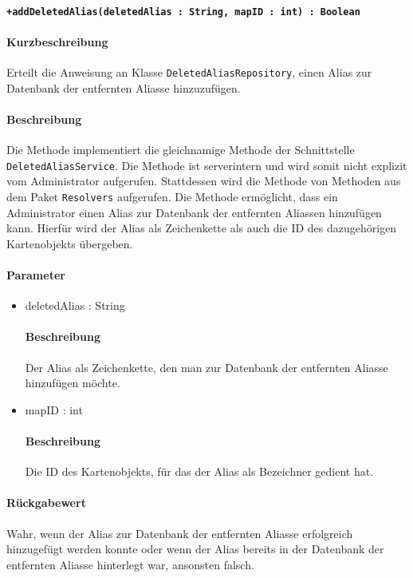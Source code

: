 \paragraph*{\texttt{+addDeletedAlias(deletedAlias : String, mapID : int) : Boolean}}%
\paragraph*{Kurzbeschreibung}
Erteilt die Anweisung an Klasse \texttt{DeletedAliasRepository}, einen Alias zur Datenbank der entfernten Aliasse hinzuzufügen.
\paragraph*{Beschreibung}
Die Methode implementiert die gleichnamige Methode der Schnittstelle \texttt{DeletedAliasService}.
Die Methode ist serverintern und wird somit nicht explizit vom Administrator aufgerufen.
Stattdessen wird die Methode von Methoden aus dem Paket \texttt{Resolvers} aufgerufen.
Die Methode ermöglicht, dass ein Administrator einen Alias zur Datenbank der entfernten Aliassen hinzufügen kann.
Hierfür wird der Alias als Zeichenkette als auch die ID des dazugehörigen Kartenobjekts übergeben.
\paragraph*{Parameter}
\begin{itemize}
    \item deletedAlias : String
    		\paragraph*{Beschreibung}
    		Der Alias als Zeichenkette, den man zur Datenbank der entfernten Aliasse hinzufügen möchte.
    \item mapID : int
    		\paragraph*{Beschreibung}
    		Die ID des Kartenobjekts, für das der Alias als Bezeichner gedient hat.
\end{itemize}
\paragraph*{Rückgabewert}
Wahr, wenn der Alias zur Datenbank der entfernten Aliasse erfolgreich hinzugefügt werden konnte oder wenn der Alias bereits in der Datenbank der entfernten Aliasse hinterlegt war, ansonsten falsch.
